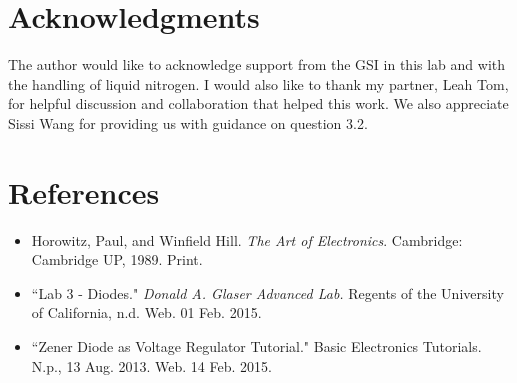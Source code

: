 \documentclass[authoryear, 12pt,5p, times]{elsarticle}
\begin{document}
\section*{Acknowledgments}
\begin{footnotesize}
The author would like to acknowledge support from the GSI in this lab and with the handling of liquid nitrogen. I would also like to thank my partner, Leah Tom, for helpful discussion and collaboration that helped this work. We also appreciate Sissi Wang for providing us with guidance on question 3.2.
\end{footnotesize}
  \section*{References}
 \begin{footnotesize}
 \begin{itemize}
 \item Horowitz, Paul, and Winfield Hill. \textit{The Art of Electronics}. Cambridge: Cambridge UP, 1989. Print.
 
 \item ``Lab 3 - Diodes." \textit{Donald A. Glaser Advanced Lab.} Regents of the University of California, n.d. Web. 01 Feb. 2015.
  \item ``Zener Diode as Voltage Regulator Tutorial." Basic Electronics Tutorials. N.p., 13 Aug. 2013. Web. 14 Feb. 2015.
\end{itemize} 
  \end{footnotesize}
\end{document}
